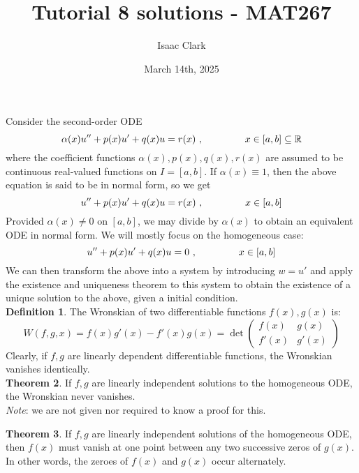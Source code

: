 \documentclass[12pt]{article}
\title{Tutorial 8 solutions - MAT267}
\author{Isaac Clark}
\date{March 14th, 2025}
\newcommand{\reals}{\mathbb{R}}
\begin{document}
\maketitle 

\noindent Consider the second-order ODE $$\alpha(x) u'' + p(x) u' + q(x)u = r(x) \ , \hspace{1.5cm} x \in [a,b] \subseteq \reals$$ where the coefficient functions $\alpha(x), p(x), q(x), r(x)$ are assumed to be continuous real-valued functions on $I = [a, b]$. If $\alpha(x) \equiv 1$, then the above equation is said to be in normal form, so we get $$u'' + p(x) u' + q(x) u = r(x) \ , \hspace{1.5cm} x \in [a, b]$$ Provided $\alpha(x) \not= 0$ on $[a, b]$, we may divide by $\alpha(x)$ to obtain an equivalent ODE in normal form. We will mostly focus on the homogeneous case: $$u'' + p(x) u' + q(x) u = 0 \ , \hspace{1.5cm} x \in [a, b]$$ We can then transform the above into a system by introducing $w = u'$ and apply the existence and uniqueness theorem to this system to obtain the existence of a unique solution to the above, given a initial condition. \\

\noindent \textbf{Definition 1}. The Wronskian of two differentiable functions $f(x), g(x)$ is: $$W(f, g, x) = f(x)g'(x) - f'(x)g(x) = \det \begin{pmatrix} f(x) & g(x) \\ f'(x) & g'(x) \end{pmatrix}$$ Clearly, if $f, g$ are linearly dependent differentiable functions, the Wronskian vanishes identically. \\

\noindent \textbf{Theorem 2}. If $f, g$ are linearly independent solutions to the homogeneous ODE, the Wronskian never vanishes. \\

\noindent \textit{Note}: we are not given nor required to know a proof for this. \newpage

\noindent \textbf{Theorem 3}. If $f, g$ are linearly independent solutions of the homogeneous ODE, then $f(x)$ must vanish at one point between any two successive zeros of $g(x)$. In other words, the zeroes of $f(x)$ and $g(x)$ occur alternately. \\
\end{document}
